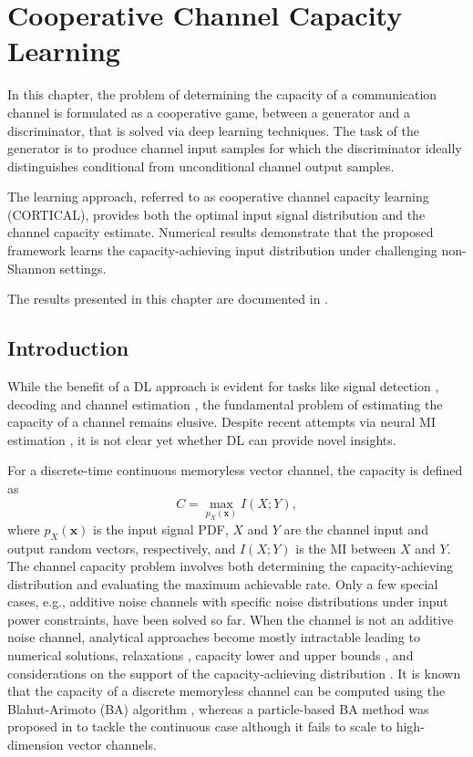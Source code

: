 \chapter{Cooperative Channel Capacity Learning} %
\label{sec:cortical}

In this chapter, the problem of determining the capacity of a communication channel is formulated as a cooperative game, between a generator and a discriminator, that is solved via deep learning techniques. The task of the generator is to produce channel input samples for which the discriminator ideally distinguishes conditional from unconditional channel output samples.

The learning approach, referred to as cooperative channel capacity learning (CORTICAL), provides both the optimal input signal distribution and the channel capacity estimate. Numerical results demonstrate that the proposed framework learns the capacity-achieving input distribution under challenging non-Shannon settings.

The results presented in this chapter are documented in \cite{LetiziaNIPS, CORTICAL}.

\section{Introduction}
\label{sec:cortical_intro}
While the benefit of a DL approach \cite{Oshea2017} is evident for tasks like signal detection \cite{Ye2017}, decoding \cite{tonello2022mind} and channel estimation \cite{Ye2018,Soltani2019}, the fundamental problem of estimating the capacity of a channel remains elusive. Despite recent attempts via neural MI estimation \cite{Aharoni2020, Letizia2021,Farhad2022}, it is not clear yet whether DL can provide novel insights.

For a discrete-time continuous memoryless vector channel, the capacity is defined as
\begin{equation}
C = \max_{p_X(\mathbf{x})} I(X;Y),
\end{equation}
where $p_X(\mathbf{x})$ is the input signal PDF, $X$ and $Y$ are the channel input and output random vectors, respectively, and $I(X; Y)$ is the MI between $X$ and $Y$. 
The channel capacity problem involves both determining the capacity-achieving distribution and evaluating the maximum achievable rate. Only a few special cases, e.g., additive noise channels with specific noise distributions under input power constraints, have been solved so far. When the channel is not an additive noise channel, analytical approaches become mostly intractable leading to numerical solutions, relaxations \cite{CuttingPlane}, capacity lower and upper bounds \cite{McKellips2004}, and considerations on the support of the capacity-achieving distribution \cite{Smith1971, Dytso2020}. 
It is known that the capacity of a discrete memoryless channel can be computed using the Blahut-Arimoto (BA) algorithm \cite{BlahutArimoto}, whereas a particle-based BA method was proposed in \cite{Dauwels2005} to tackle the continuous case although it fails to scale to high-dimension vector channels.

